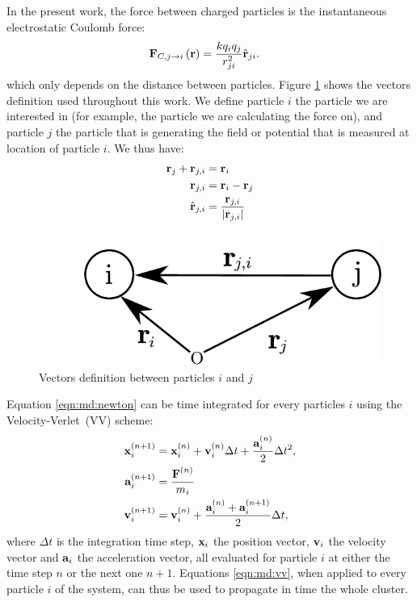 In the present work, the force between charged particles is the instantaneous
electrostatic Coulomb force:
\begin{align}
\textbf{F}_{C,j \rightarrow i}\left( \textbf{r} \right) & =\frac{k q_i q_j}{r_{ji}^2} \hat{\textbf{r}}_{ji}.
\label{eqn:md:coulomb:F}
\end{align}
which only depends on the distance between particles. Figure
\ref{fig:md:vectors} shows the vectors definition used throughout this work. We
define particle $i$ the particle we are interested in (for example, the
particle we are calculating the force on), and particle $j$ the particle that
is generating the field or potential that is measured at location of particle
$i$. We thus have:
\begin{align}
\textbf{r}_{j} + \textbf{r}_{j,i} & = \textbf{r}_{i} \\
\textbf{r}_{j,i} & = \textbf{r}_{i} - \textbf{r}_{j} \\
\hat{\textbf{r}}_{j,i} & = \frac{\textbf{r}_{j,i}}{\left| \textbf{r}_{j,i} \right|}
\end{align}
%
\begin{figure}
 \centering
 \includegraphics[width=0.5\columnwidth]{figures/vectors}
 \caption{\label{fig:md:vectors}Vectors definition between particles $i$ and $j$}
\end{figure}
%
%
Equation \eqref{eqn:md:newton} can be time integrated for every particles
$i$ using the Velocity-Verlet~(VV) scheme:
\begin{subequations}
\label{eqn:md:vv}
\begin{align}
\textbf{x}_{i}^{\left( n+1 \right)} & = \textbf{x}_{i}^{\left( n \right)} + \textbf{v}_{i}^{\left( n \right)} \Delta t +
\frac{\textbf{a}_{i}^{\left( n \right)}}{2} \Delta t^2, \\
\textbf{a}_{i}^{\left( n+1 \right)} & = \frac{\textbf{F}^{\left( n \right)}}{m_i} \label{eqn:md:vv:a} \\
\textbf{v}_{i}^{\left( n+1 \right)} & = \textbf{v}_{i}^{\left( n \right)} + \frac{\textbf{a}_{i}^{\left( n \right)} +
\textbf{a}_{i}^{\left( n+1 \right)}}{2} \Delta t,
\end{align}
\end{subequations}
where $\Delta t$ is the integration time step, $\textbf{x}_{i}$ the position vector,
$\textbf{v}_{i}$ the velocity vector and $\textbf{a}_{i}$ the acceleration vector, all evaluated
for particle $i$ at either the time step $n$ or the next one $n+1$.
Equations \eqref{eqn:md:vv}, when applied to every particle $i$ of the system,
can thus be used to propagate in time the whole cluster.

